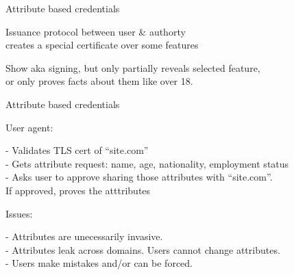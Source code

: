 \documentclass{beamer}
\begin{document}
\begin{frame} %

Attribute based credentials  \\ \bigskip

Issuance protocol between user \& authorty \\
\hspace{10pt} creates a special certificate over some features \\ \medskip

Show aka signing, but only partially reveals selected feature,  \\
\hspace{10pt} or only proves facts about them like over 18.

\bigskip\bigskip


\end{frame}



\begin{frame} %

Attribute based credentials %

\bigskip\smallskip

User agent: \\ \smallskip

- Validates TLS cert of ``site.com'' \\ \smallskip
- Gets attribute request: name, age, nationality, employment status \\ \smallskip
{}
- Asks user to approve sharing those attributes with ``site.com''. \\
\hspace{10pt} If approved, proves the atttributes

\bigskip\smallskip

Issues: \\ \smallskip

- Attributes are unecessarily invasive. \\ \smallskip
- Attributes leak across domains.  Users cannot change attributes. \\ \smallskip
- Users make mistakes and/or can be forced. \\ \medskip
\hspace{30pt}  

\end{frame}
\end{document}
